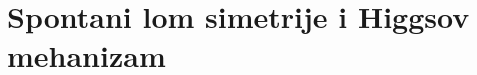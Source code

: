 \documentclass[a4paper,12pt]{report}
\begin{document}

\section{Spontani lom simetrije i Higgsov mehanizam}
\end{document}
